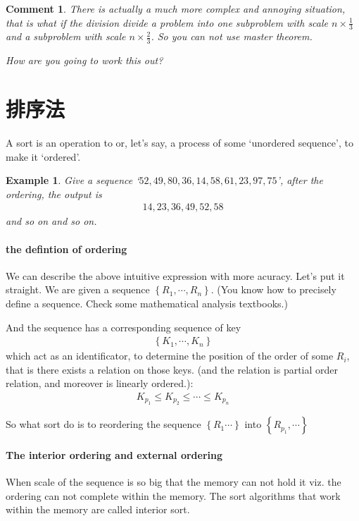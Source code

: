 \documentclass[a4paper, 10pt]{ctexart} %
\newtheorem{example}{Example}
\newtheorem{corollary}{Comment}
\begin{document}
\begin{corollary}
    There is actually a much more complex and annoying situation, that is what if the division divide 
    a problem into one subproblem with scale $n \times \frac{1}{3}$ and a subproblem with scale $n \times \frac{2}{3}$. So you can not 
    use master theorem.

    How are you going to work this out?
\end{corollary}

\section{排序法}
A sort is an operation to or, let's say, a process of some `unordered sequence', to make it `ordered'. 
\begin{example}
    Give a sequence `$52 , 49 , 80 ,  36  , 14 , 58 ,  61 , 23 , 97 , 75$', after the ordering,
    the output is 
    \begin{align*}
        14, 23 , 36  , 49 , 52 ,  58 
    \end{align*}
    and so on and so on.
\end{example}

\paragraph{the defintion of ordering} We can describe the above intuitive expression with more acuracy.
Let's put it straight. We are given a sequence $\left\{R_{1}, \cdots   ,R_{n}\right\}$. (You know how to precisely define 
a sequence. Check some mathematical analysis textbooks.)

And the sequence has a corresponding sequence of key
\begin{align*}
    \left\{K_{1} , \cdots  , K_{n}\right\}
\end{align*}
which act as an identificator, to determine the position of the order of some $R_{i}$, that is there exists a relation on those keys. (and the relation is partial order relation, and moreover is 
linearly ordered.):
\begin{align*}
    K_{p_{1}} \le K_{p_{2}} \le \cdots  \le K_{p_{n}}
\end{align*}

So what sort do is to reordering the sequence $\left\{R_{1} \cdots \right\}$ into $\left\{ R_{p_{1}}, \cdots \right\}$

\paragraph{The interior ordering and external ordering} When scale of the sequence is so big that the memory can not 
hold it viz. the ordering can not complete within the memory. 
The sort algorithms that work within the memory are called interior sort.
\end{document}
